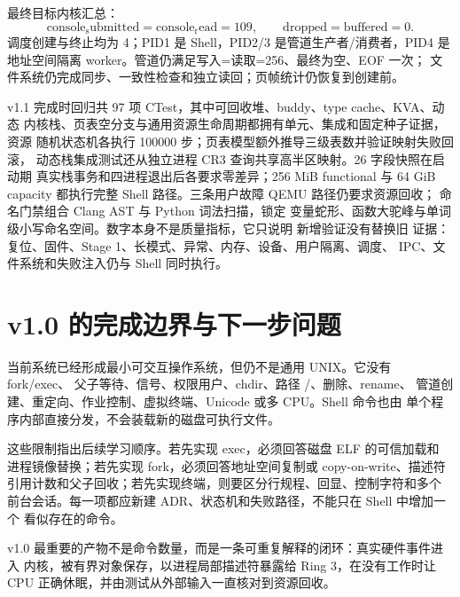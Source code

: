 最终目标内核汇总：
\[
  \mathrm{console_submitted}
  =
  \mathrm{console_read}
  =109,\qquad
  \mathrm{dropped}
  =
  \mathrm{buffered}
  =0.
\]
调度创建与终止均为 4；PID1 是 Shell，PID2/3 是管道生产者/消费者，PID4
是地址空间隔离 worker。管道仍满足写入=读取=256、最终为空、EOF 一次；
文件系统仍完成同步、一致性检查和独立读回；页帧统计仍恢复到创建前。

v1.1 完成时回归共 97 项 CTest，其中可回收堆、buddy、type cache、KVA、动态
内核栈、页表空分支与通用资源生命周期都拥有单元、集成和固定种子证据，资源
随机状态机各执行 100000 步；页表模型额外推导三级表数并验证映射失败回滚，
动态栈集成测试还从独立进程 CR3 查询共享高半区映射。26 字段快照在启动期
真实栈事务和四进程退出后各要求零差异；256 MiB functional 与 64 GiB
capacity 都执行完整 Shell 路径。三条用户故障 QEMU 路径仍要求资源回收；
命名门禁组合 Clang AST 与 Python
词法扫描，锁定
变量蛇形、函数大驼峰与单词级小写命名空间。数字本身不是质量指标，它只说明
新增验证没有替换旧
证据：复位、固件、Stage 1、长模式、异常、内存、设备、用户隔离、调度、
IPC、文件系统和失败注入仍与 Shell 同时执行。

\section{v1.0 的完成边界与下一步问题}

当前系统已经形成最小可交互操作系统，但仍不是通用 UNIX。它没有 fork/exec、
父子等待、信号、权限用户、chdir、路径 /、删除、rename、
管道创建、重定向、作业控制、虚拟终端、Unicode 或多 CPU。Shell 命令也由
单个程序内部直接分发，不会装载新的磁盘可执行文件。

这些限制指出后续学习顺序。若先实现 exec，必须回答磁盘 ELF 的可信加载和
进程镜像替换；若先实现 fork，必须回答地址空间复制或 copy-on-write、描述符
引用计数和父子回收；若先实现终端，则要区分行规程、回显、控制字符和多个
前台会话。每一项都应新建 ADR、状态机和失败路径，不能只在 Shell 中增加一个
看似存在的命令。

\begin{keyidea}
v1.0 最重要的产物不是命令数量，而是一条可重复解释的闭环：真实硬件事件进入
内核，被有界对象保存，以进程局部描述符暴露给 Ring 3，在没有工作时让 CPU
正确休眠，并由测试从外部输入一直核对到资源回收。
\end{keyidea}
